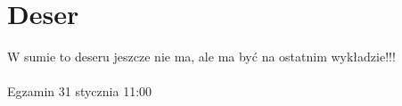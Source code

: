 \documentclass[12pt,a4paper]{article}
\theoremstyle{break}
\begin{document}
	
	
	
	
	\newpage
	\section{Deser}
	\begin{center}
		{\fontsize{30}{36}\selectfont\faBirthdayCake}
	\end{center} 
	
	
	
	
	
	
	W sumie to deseru jeszcze nie ma, ale ma być na ostatnim wykładzie!!! \\\\
	Egzamin 31 stycznia 11:00
	
		
	
	

	
	
\end{document}
